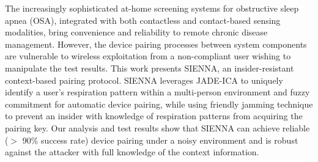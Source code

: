 The increasingly sophisticated at-home screening systems for obstructive sleep apnea (OSA), integrated with both contactless and contact-based sensing modalities, bring convenience and reliability to remote chronic disease management. However, the device pairing processes between system components are vulnerable to wireless exploitation from a non-compliant user wishing to manipulate the test results. This work presents SIENNA, an insider-resistant context-based pairing protocol. SIENNA leverages JADE-ICA to uniquely identify a user's respiration pattern within a multi-person environment and fuzzy commitment for automatic device pairing, while using friendly jamming technique to prevent an insider with knowledge of respiration patterns from acquiring the pairing key. Our analysis and test results show that SIENNA can achieve reliable ($>$ 90\% success rate) device pairing under a noisy environment and is robust against the attacker with full knowledge of the context information.



